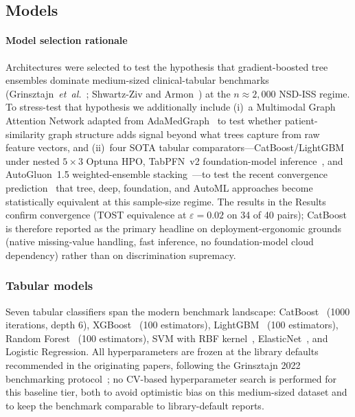 \documentclass[10pt,letterpaper]{article}
\begin{document}
\subsection*{Models}

\paragraph*{Model selection rationale} Architectures were selected to test the hypothesis that gradient-boosted tree ensembles dominate medium-sized clinical-tabular benchmarks (Grinsztajn~\textit{et~al.}~\cite{grinsztajn2022}; Shwartz-Ziv and Armon~\cite{shwartzziv2022}) at the $n \approx 2{,}000$ NSD-ISS regime. To stress-test that hypothesis we additionally include (i)~a Multimodal Graph Attention Network adapted from AdaMedGraph~\cite{adamedgraph} to test whether patient-similarity graph structure adds signal beyond what trees capture from raw feature vectors, and (ii)~four SOTA tabular comparators---CatBoost/LightGBM under nested $5{\times}3$ Optuna HPO, TabPFN~v2 foundation-model inference~\cite{hollmann2025tabpfn}, and AutoGluon~1.5 weighted-ensemble stacking~\cite{erickson2020autogluon}---to test the recent convergence prediction~\cite{zabergja2024dltabular,ye2024closertabular} that tree, deep, foundation, and AutoML approaches become statistically equivalent at this sample-size regime. The results in the Results confirm convergence (TOST equivalence at $\varepsilon{=}0.02$ on 34 of 40 pairs); CatBoost is therefore reported as the primary headline on deployment-ergonomic grounds (native missing-value handling, fast inference, no foundation-model cloud dependency) rather than on discrimination supremacy.

\subsubsection*{Tabular models}
Seven tabular classifiers span the modern benchmark landscape: CatBoost~\cite{prokhorenkova2018catboost} (1000 iterations, depth 6), XGBoost~\cite{chen2016xgboost} (100 estimators), LightGBM~\cite{ke2017lightgbm} (100 estimators), Random Forest~\cite{breiman2001} (100 estimators), SVM with RBF kernel~\cite{cortes1995svm}, ElasticNet~\cite{zou2005elastic}, and Logistic Regression. All hyperparameters are frozen at the library defaults recommended in the originating papers, following the Grinsztajn 2022 benchmarking protocol~\cite{grinsztajn2022}; no CV-based hyperparameter search is performed for this baseline tier, both to avoid optimistic bias on this medium-sized dataset and to keep the benchmark comparable to library-default reports.
\end{document}
